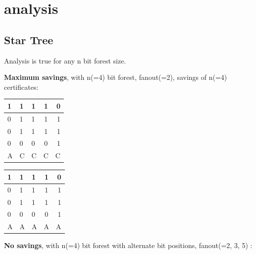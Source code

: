\chapter{analysis}

\section{Star Tree}

	Analysis is true for any n bit forest size.

	\textbf{Maximum savings}, with n(=4) bit forest, fanout(=2), savings of n(=4) certificates:

	\begin{multicols}{2}

		\begin{tabular}{ l | l l c r }
		  1 & 1 & 1 & 1 & 0 \\
		  \hline
		  0 & 1 & 1 & 1 & 1 \\
		  0 & 1 & 1 & 1 & 1 \\
		  0 & 0 & 0 & 0 & 1 \\
		  \hline	
		  A & C & C & C & C\\
		\end{tabular}
	\columnbreak{|}
		\begin{tabular}{ l | l l c r }
		  1 & 1 & 1 & 1 & 0 \\
		  \hline
		  0 & 1 & 1 & 1 & 1 \\
		  0 & 1 & 1 & 1 & 1 \\
		  0 & 0 & 0 & 0 & 1 \\
		  \hline	
		  A & A & A & A & A\\
		\end{tabular}
	\end{multicols}

	\textbf{No savings}, with n(=4) bit forest with alternate bit positions, fanout(=2, 3, 5) :

